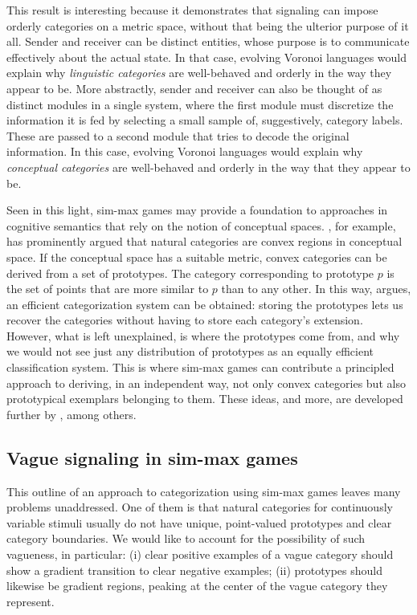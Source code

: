 \documentclass[fleqn,reqno,10pt]{article}
\begin{document}
This result is interesting because it demonstrates that signaling can
impose orderly categories on a metric space, without that being the
ulterior purpose of it all. Sender and receiver can be distinct
entities, whose purpose is to communicate effectively about the actual
state. In that case, evolving Voronoi languages would explain why
\emph{linguistic categories} are well-behaved and orderly in the way
they appear to be. More abstractly, sender and receiver can also be
thought of as distinct modules in a single system, where the first
module must discretize the information it is fed by selecting a small
sample of, suggestively, category labels. These are passed to a second
module that tries to decode the original information. In this case,
evolving Voronoi languages would explain why \emph{conceptual
  categories} are well-behaved and orderly in the way that they appear
to be.

Seen in this light, sim-max games may provide a foundation to approaches in cognitive semantics
that rely on the notion of conceptual spaces.
\citet[][70--77]{Gardenfors2000:Conceptual-Spac}, for example, has prominently argued that
natural categories are convex regions in conceptual space. If the conceptual space has a
suitable metric, convex categories can be derived from a set of prototypes. The category
corresponding to prototype $p$ is the set of points that are more similar to $p$ than to any
other. In this way, \citet{Gardenfors2000:Conceptual-Spac} argues, an efficient categorization
system can be obtained: storing the prototypes lets us recover the categories without having to
store each category's extension. However, what is left unexplained, is where the prototypes
come from, and why we would not see just any distribution of prototypes as an equally efficient
classification system. This is where sim-max games can contribute a principled approach to
deriving, in an independent way, not only convex categories but also prototypical exemplars
belonging to them.  These ideas, and more, are developed further by
\citet{Jager2007:The-Evolution-o,JagerRooijvan-Rooij2007:Language-Struct,JagerMetzger2011:Voronoi-Languag,OConnor2014-OCOEPC},
among others.

\subsection{Vague signaling in sim-max games}

This outline of an approach to categorization using sim-max games
leaves many problems unaddressed. One of them is that natural
categories for continuously variable stimuli usually do not have
unique, point-valued prototypes and clear category boundaries. We
would like to account for the possibility of such vagueness, in
particular: (i) clear positive examples of a vague category should
show a gradient transition to clear negative examples;
(ii) prototypes should likewise be gradient regions, peaking at the
center of the vague category they represent.
\end{document}
